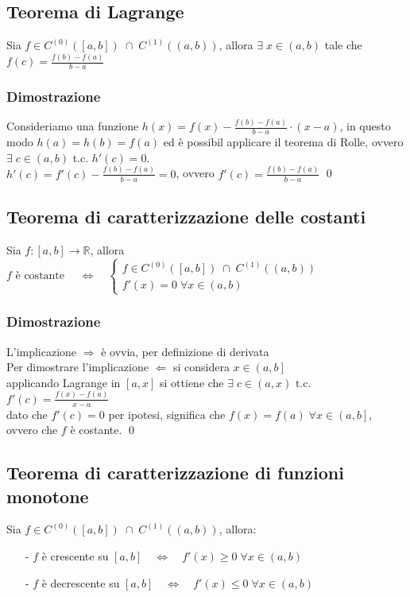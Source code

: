 \documentclass[a4paper]{article}
\newcommand\cont[2]{C^{(#1)} \left({#2}\right)}
\begin{document}
\subsection{Teorema di Lagrange}
Sia \(f \in \cont{0}{\left[a, b\right]} \; \cap \; \cont{1}{\left(a, b\right)}\), allora \(\exists \; x \in \left(a, b\right)\) tale
che \(\displaystyle f(c) = \frac{f(b) - f(a)}{b - a}\)

\subsubsection*{Dimostrazione}
Consideriamo una funzione \(\displaystyle h(x) = f(x) - \frac{f(b) - f(a)}{b- a} \cdot \left(x - a\right)\), in questo modo \(h(a) = h(b) = f(a)\)
ed è possibil applicare il teorema di Rolle, ovvero \(\exists \; c \in \left(a, b\right)\) t.c. \(h'(c) = 0\). \\
\(\displaystyle h'(c) = f'(c) - \frac{f(b) - f(a)}{b - a} = 0\), ovvero \(\displaystyle f'(c) = \frac{f(b) - f(a)}{b - a}\)
\qed

\subsection{Teorema di caratterizzazione delle costanti}
Sia \(f:\left[a,b\right] \to \mathbb{R}\), allora \(\displaystyle f \text{ è costante } \quad \Leftrightarrow \quad
\begin{cases}
	f \in \cont{0}{\left[a, b\right]} \; \cap \; \cont{1}{\left(a, b\right)} \\
	f'(x) = 0 \; \forall x \in \left(a, b\right)
\end{cases}\)

\subsubsection*{Dimostrazione}
L'implicazione \(\Rightarrow\) è ovvia, per definizione di derivata \\
Per dimostrare l'implicazione \(\Leftarrow\) si considera \(x \in \left(a, b\right]\) \\
applicando Lagrange in \(\left[a, x\right]\) si ottiene che \(\exists \; c \in \left(a, x\right)\) t.c. \(\displaystyle f'(c) = \frac{f(x)- f(a)}{x-a}\) \\
dato che \(f'(c) = 0\) per ipotesi, significa che \(f(x) = f(a) \; \forall x \in \left(a, b\right]\), ovvero che \(f\) è costante.
\qed

\subsection{Teorema di caratterizzazione di funzioni monotone}
Sia \(f \in \cont{0}{\left[a, b\right]} \; \cap \; \cont{1}{\left(a, b\right)}\), allora:
\begin{itemize}[topsep=3pt, itemsep=0pt]
	\item[-] \(f\) è crescente su \(\left[a, b\right] \quad \Leftrightarrow \quad f'(x) \geq 0 \; \forall x \in \left(a, b\right)\) 
	\item[-] \(f\) è decrescente su \(\left[a, b\right] \quad \Leftrightarrow \quad f'(x) \leq 0 \; \forall x \in \left(a, b\right)\) 
\end{itemize}
\end{document}
